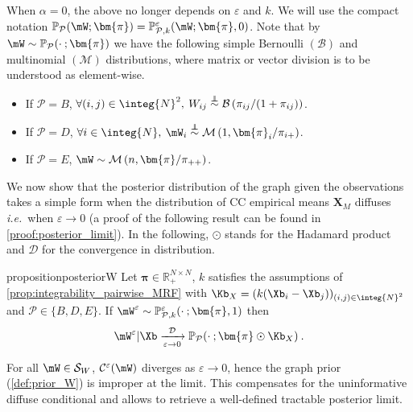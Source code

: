 When $\alpha = 0$, the above no longer depends on $\varepsilon$ and $k$. We will use the compact notation $\mathbb{P}_{\mathcal{P}}(\mW ; \bm{\pi}) = \mathbb{P}_{\mathcal{P},k}^{\varepsilon}(\mW; \bm{\pi}, 0)$. Note that by $\mW \sim \mathbb{P}_{\mathcal{P}}(\cdot \: ; \bm{\pi})$ we have the following simple Bernoulli $(\mathcal{B})$ and multinomial $(\mathcal{M})$ distributions, where matrix or vector division is to be understood as element-wise.
\begin{itemize}
    \item If $\mathcal{P} = B$, $\forall (i,j) \in \integ{N}^2, \: W_{ij} \stackrel{\perp\!\!\!\!\perp}{\sim} \mathcal{B}\left(\pi_{ij}/(1 + \pi_{ij}) \right)$.
    \item If $\mathcal{P} = D$, $\forall i \in \integ{N}, \: \mW_{i} \stackrel{\perp\!\!\!\!\perp}{\sim} \mathcal{M}\left(1, \bm{\pi}_{i}/\pi_{i+} \right)$.
    \item If $\mathcal{P} = E$, $\mW \sim \mathcal{M}\left(n, \bm{\pi}/\pi_{++} \right)$.
\end{itemize}

We now show that the posterior distribution of the graph given the observations takes a simple form when the distribution of CC empirical means $\bm{X}_{M}$ diffuses \textit{i.e.}\ when $\varepsilon \to 0$ (a proof of the following result can be found in \cref{proof:posterior_limit}). In the following, $\odot$ stands for the Hadamard product and $\mathcal{D}$ for the convergence in distribution.

\begin{restatable}{proposition}{posteriorW}
\label{prop:posterior_W}
Let $\bm{\pi} \in \mathbb{R}_+^{N \times N}$, $k$ satisfies the assumptions of \cref{prop:integrability_pairwise_MRF} with  $\Kb_{X} = (k(\Xb_{i} - \Xb_{j}))_{(i,j) \in \integ{N}^2}$ and $\mathcal{P}\in \{B, D, E\}$. If $\mW^{\varepsilon} \sim \mathbb{P}_{\mathcal{P},k}^{\varepsilon}(\cdot \: ; \bm{\pi},1)$ then
$$\mW^{\varepsilon} | \Xb \xrightarrow[\varepsilon \to 0]{\mathcal{D}} \mathbb{P}_{\mathcal{P}}(\cdot \: ;\bm{\pi} \odot \Kb_{X}) \:.$$
\end{restatable}

\begin{remark}
For all $\mW \in \mathcal{S}_{W}$, $\mathcal{C}^{\varepsilon}(\mW)$ diverges as $\varepsilon \to 0$, hence the graph prior (\cref{def:prior_W}) is improper at the limit. This compensates for the uninformative diffuse conditional and allows to retrieve a well-defined tractable posterior limit.
\end{remark}

